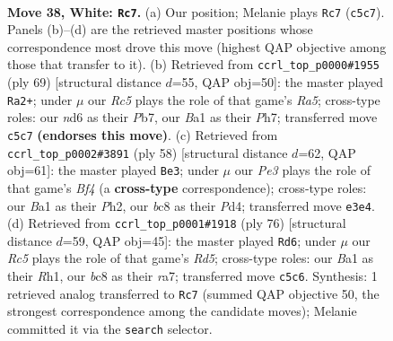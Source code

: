 \documentclass[11pt]{article}
\begin{document}
\clearpage

\begin{figure}[p]\centering
\begin{subfigure}{0.46\textwidth}\centering
\resizebox{\linewidth}{!}{%
\newchessgame
\chessboard[
  setfen={1rb2k2/7p/3n4/1pR3p1/r7/4P1P1/P4PKP/B3R3 w - - 0 38},
  showmover=false,
  pgfstyle=straightmove, color=movearrow, markmove={c5-c7}
]}
\caption{}
\end{subfigure}\hfill
\begin{subfigure}{0.46\textwidth}\centering
\resizebox{\linewidth}{!}{%
\newchessgame
\chessboard[
  setfen={6r1/1p2kp1p/p1p1p3/2R5/rP1P2P1/5B2/6K1/1R6 b - - 1 35},
  showmover=false,
  pgfstyle=straightmove, color=movearrow, markmove={a4-a2}
]}
\caption{}
\end{subfigure}
\\[4pt]
\begin{subfigure}{0.46\textwidth}\centering
\resizebox{\linewidth}{!}{%
\newchessgame
\chessboard[
  setfen={6k1/3rbp2/p5p1/1p6/2rPRB2/1RP5/P4P1P/5K2 w - - 1 30},
  showmover=false,
  pgfstyle=straightmove, color=movearrow, markmove={f4-e3}
]}
\caption{}
\end{subfigure}\hfill
\begin{subfigure}{0.46\textwidth}\centering
\resizebox{\linewidth}{!}{%
\newchessgame
\chessboard[
  setfen={3bk3/r5p1/1p6/1P1R4/3P1P1r/3KP2P/1P6/7R w - - 1 39},
  showmover=false,
  pgfstyle=straightmove, color=movearrow, markmove={d5-d6}
]}
\caption{}
\end{subfigure}
\caption{\textbf{Move 38, White: \texttt{Rc7}.} (a) Our position; Melanie plays \texttt{Rc7} (\texttt{c5c7}). Panels (b)--(d) are the retrieved master positions whose correspondence most drove this move (highest QAP objective among those that transfer to it). (b) Retrieved from \texttt{ccrl\_top\_p0000\#1955} (ply 69) [structural distance $d$=55, QAP obj=50]: the master played \texttt{Ra2+}; under $\mu$ our \emph{Rc5} plays the role of that game's \emph{Ra5}; cross-type roles: our \emph{n}d6 as their \emph{P}b7, our \emph{B}a1 as their \emph{P}h7; transferred move \texttt{c5c7} \textbf{(endorses this move)}. (c) Retrieved from \texttt{ccrl\_top\_p0002\#3891} (ply 58) [structural distance $d$=62, QAP obj=61]: the master played \texttt{Be3}; under $\mu$ our \emph{Pe3} plays the role of that game's \emph{Bf4} (a \textbf{cross-type} correspondence); cross-type roles: our \emph{B}a1 as their \emph{P}h2, our \emph{b}c8 as their \emph{P}d4; transferred move \texttt{e3e4}. (d) Retrieved from \texttt{ccrl\_top\_p0001\#1918} (ply 76) [structural distance $d$=59, QAP obj=45]: the master played \texttt{Rd6}; under $\mu$ our \emph{Rc5} plays the role of that game's \emph{Rd5}; cross-type roles: our \emph{B}a1 as their \emph{R}h1, our \emph{b}c8 as their \emph{r}a7; transferred move \texttt{c5c6}. Synthesis: 1 retrieved analog transferred to \texttt{Rc7} (summed QAP objective 50, the strongest correspondence among the candidate moves); Melanie committed it via the \texttt{search} selector.}
\label{fig:thought-m74}
\end{figure}
\end{document}
